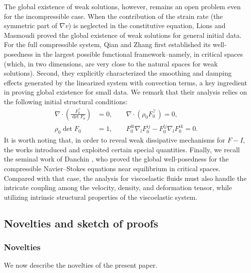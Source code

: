 \documentclass[reqno,11pt]{amsart}
\numberwithin{equation}{section}
\begin{document}
The global existence of weak solutions, however, remains an open problem even for the incompressible case. When the contribution of the strain rate (the symmetric part of $\nabla v$) is neglected in the constitutive equation, Lions and Masmoudi \cite{ref20z} proved the global existence of weak solutions for general initial data. For the full compressible system, Qian and Zhang \cite{QZ-ARMA-2010} first established its well-posedness in the largest possible functional framework--namely, in critical spaces (which, in two dimensions, are very close to the natural spaces for weak solutions). Second, they explicitly characterized the smoothing and damping effects generated by the linearized system with convection terms, a key ingredient in proving global existence for small data. We remark that their analysis relies on the following initial structural conditions:
\begin{align*}
\nabla \cdot \left( \frac{F_{0}^{\top}}{\operatorname{det} F_{0}} \right) &= 0, \qquad \nabla \cdot \left( \rho_{0} F_{0}^{\top} \right) = 0, \\
\rho_{0} \operatorname{det} F_{0} &= 1, \qquad F_{0}^{l k} \nabla_{l} F_{0}^{i j} - F_{0}^{l j} \nabla_{l} F_{0}^{i k} = 0.
\end{align*}
It is worth noting that, in order to reveal weak dissipative mechanisms for $F-I$, the works \cite{ref6z,ref16z,ref18z} introduced and exploited certain special quantities. Finally, we recall the seminal work of Danchin \cite{ref7z}, who proved the global well-posedness for the compressible Navier--Stokes equations near equilibrium in critical spaces. Compared with that case, the analysis for viscoelastic fluids must also handle the intricate coupling among the velocity, density, and deformation tensor, while utilizing intrinsic structural properties of the viscoelastic system.


\subsection{Novelties and sketch of proofs}

\subsubsection{Novelties}\label{Subsec:n}

We now describe the novelties of the present paper.
\end{document}

